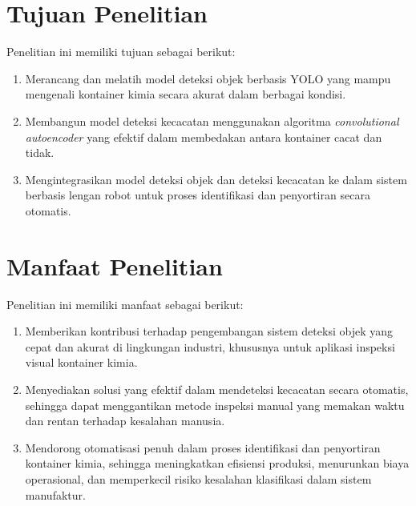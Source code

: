 \section{Tujuan Penelitian}
Penelitian ini memiliki tujuan sebagai berikut:
\begin{enumerate}
  \item Merancang dan melatih model deteksi objek berbasis YOLO yang
    mampu mengenali kontainer kimia secara akurat dalam berbagai kondisi.
  \item Membangun model deteksi kecacatan menggunakan algoritma
    \textit{convolutional autoencoder} yang efektif dalam membedakan antara
    kontainer cacat dan tidak.
  \item Mengintegrasikan model deteksi objek dan deteksi kecacatan ke
    dalam sistem berbasis lengan robot untuk proses identifikasi dan
    penyortiran secara otomatis.
\end{enumerate}

\vspace{1em}

\section{Manfaat Penelitian}
Penelitian ini memiliki manfaat sebagai berikut:
\begin{enumerate}
  \item Memberikan kontribusi terhadap pengembangan sistem deteksi
    objek yang cepat dan akurat di lingkungan industri, khususnya
    untuk aplikasi inspeksi visual kontainer kimia.
  \item Menyediakan solusi yang efektif dalam mendeteksi kecacatan secara
    otomatis, sehingga dapat menggantikan metode inspeksi manual yang
    memakan waktu dan rentan terhadap kesalahan manusia.
  \item Mendorong otomatisasi penuh dalam proses identifikasi dan
    penyortiran kontainer kimia, sehingga meningkatkan efisiensi
    produksi, menurunkan biaya operasional, dan memperkecil risiko
    kesalahan klasifikasi dalam sistem manufaktur.
\end{enumerate}

